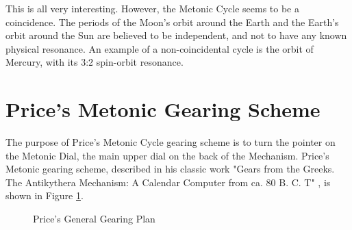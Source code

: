 \documentclass[11pt, oneside]{article}   	%
\theoremstyle{definition}
\begin{document}
\bigskip
\bigskip
\noindent
This is all very interesting. However, the Metonic Cycle seems to be a coincidence. The periods of the Moon's orbit around the Earth and the Earth's 
orbit around the Sun are believed to be independent, and not to have any known physical resonance. An example of a non-coincidental 
cycle is the orbit of Mercury, with its 3:2 spin-orbit resonance.

\section{Price's Metonic Gearing Scheme}
The purpose of Price's  Metonic Cycle gearing scheme is to turn the pointer on the Metonic Dial, the main upper dial on the back of the Mechanism. 
Price's Metonic gearing scheme, described in his classic work "Gears from the Greeks. The Antikythera Mechanism: A Calendar Computer from 
ca. 80 B. C. T" \cite{gears_from_the_greeks},  is shown in Figure \ref{fig:general_gearing_plan}. 

\bigskip
\begin{figure}[H]
\caption{Price's General Gearing Plan \cite{gears_from_the_greeks}}
\label{fig:general_gearing_plan}
\end{figure}
\end{document}
